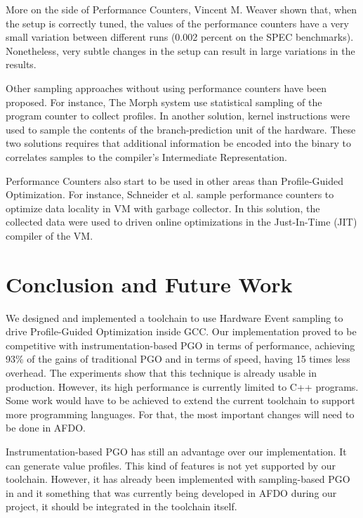 \documentclass[9pt,english,twocolumn,letter]{article}
\begin{document}
More on the side of Performance Counters, Vincent M. Weaver shown that, when the setup is correctly tuned, the values of the performance counters have a very small variation between different runs (0.002 percent on the SPEC benchmarks). Nonetheless, very subtle changes in the setup can result in large variations in the results\cite{Weaver2008}.

Other sampling approaches without using performance counters have been proposed. For instance, The Morph system use statistical sampling of the program counter to collect profiles\cite{Zhang1997}. In another solution, kernel instructions were used to sample the contents of the branch-prediction unit of the hardware\cite{Conte1996}. These two solutions requires that additional information be encoded into the binary to correlates samples to the compiler's Intermediate Representation.

Performance Counters also start to be used in other areas than Profile-Guided Optimization. For instance, Schneider et al. sample performance counters to optimize data locality in VM with garbage collector\cite{Schneider2007}. In this solution, the collected data were used to driven online optimizations in the Just-In-Time (JIT) compiler of the VM.

\section{Conclusion and Future Work}
\label{sec:conclusion}

We designed and implemented a toolchain to use Hardware Event sampling to drive Profile-Guided Optimization inside GCC. Our implementation proved to be competitive with instrumentation-based PGO in terms of performance, achieving 93\% of the gains of traditional PGO and in terms of speed, having 15 times less overhead. The experiments show that this technique is already usable in production. However, its high performance is currently limited to C++ programs. Some work would have to be achieved to extend the current toolchain to support more programming languages. For that, the most important changes will need to be done in AFDO.

Instrumentation-based PGO has still an advantage over our implementation. It can generate value profiles. This kind of features is not yet supported by our toolchain. However, it has already been implemented with sampling-based PGO in \cite{Chen2010} and it something that was currently being developed in AFDO during our project, it should be integrated in the toolchain itself.
\end{document}
